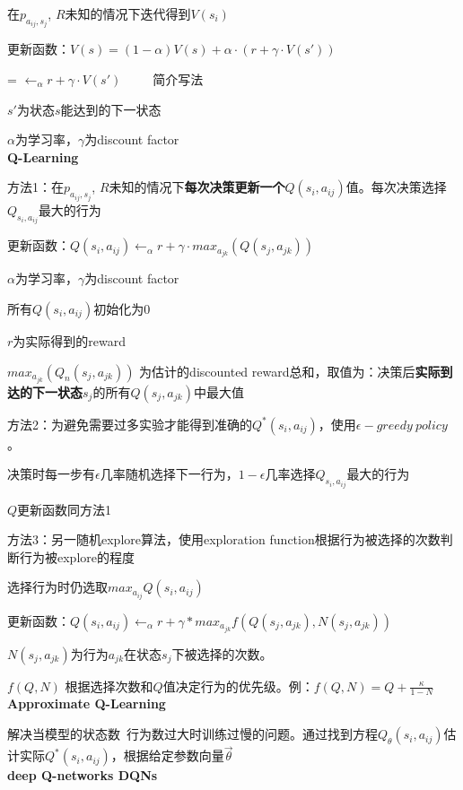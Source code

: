 \documentclass[UTF8]{ctexart}
\begin{document}
  在$p_{a_{ij}, s_j}$, $R$未知的情况下迭代得到$V(s_i)$
  
  更新函数：$V(s) = (1-\alpha)V(s) + \alpha \cdot (r + \gamma \cdot V(s'))$
  
  \quad = $\leftarrow_{\alpha} r + \gamma \cdot V(s') $\ \ \ \ \ 简介写法
  
  \quad $s'$为状态$s$能达到的下一状态
  
  \quad $\alpha$为学习率，$\gamma$为discount factor\\
\textbf{Q-Learning}

  方法1：在$p_{a_{ij}, s_j}$, $R$未知的情况下\textbf{每次决策更新一个}$Q(s_i, a_{ij})$值。每次决策选择$Q_{s_i, a_{ij}}$最大的行为

  \quad 更新函数：$Q(s_i, a_{ij}) \leftarrow_{\alpha} r + \gamma \cdot max_{a_{jk}} (Q(s_j, a_{jk}))$

  \quad \quad $\alpha$为学习率，$\gamma$为discount factor

  \quad \quad 所有$Q(s_i, a_{ij})$初始化为0
  
  \quad \quad $r$为实际得到的reward

  \quad \quad $max_{a_{jk}} (Q_{n}(s_j, a_{jk}))$ 为估计的discounted reward总和，取值为：决策后\textbf{实际到达的下一状态}$s_j$的所有$Q(s_j, a_{jk})$中最大值

  方法2：为避免需要过多实验才能得到准确的$Q^*(s_i, a_{ij})$，使用$\epsilon-greedy\ policy$。
  
  \quad 决策时每一步有$\epsilon$几率随机选择下一行为，$1-\epsilon$几率选择$Q_{s_i, a_{ij}}$最大的行为

  \quad $Q$更新函数同方法1
  
  方法3：另一随机explore算法，使用exploration function根据行为被选择的次数判断行为被explore的程度
  
  \quad 选择行为时仍选取$max_{a_{ij}} Q(s_i, a_{ij})$
  
  \quad 更新函数：$Q(s_i, a_{ij}) \leftarrow_{\alpha} r + \gamma * max_{a_{jk}} f(Q(s_j, a_{jk}), N(s_j, a_{jk}))$
  
  \quad \quad $N(s_j, a_{jk})$为行为$a_{jk}$在状态$s_j$下被选择的次数。
  
  \quad \quad $f(Q, N)$ 根据选择次数和$Q$值决定行为的优先级。例：$f(Q, N) = Q + \frac{\kappa}{1 - N} $\\
\textbf{Approximate Q-Learning}

  解决当模型的状态数\ 行为数过大时训练过慢的问题。通过找到方程$Q_{\theta}(s_i, a_{ij})$估计实际$Q^*(s_i, a_{ij})$，根据给定参数向量$\vec{\theta}$\\
\textbf{deep Q-networks DQNs}
\end{document}
